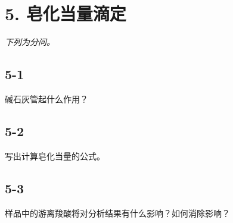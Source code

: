 \section*{5. 皂化当量滴定}
\textit{下列为分问。}

\subsection*{5-1}
碱⽯灰管起什么作⽤？

\subsection*{5-2}
写出计算皂化当量的公式。

\subsection*{5-3}
样品中的游离羧酸将对分析结果有什么影响？如何消除影响？
